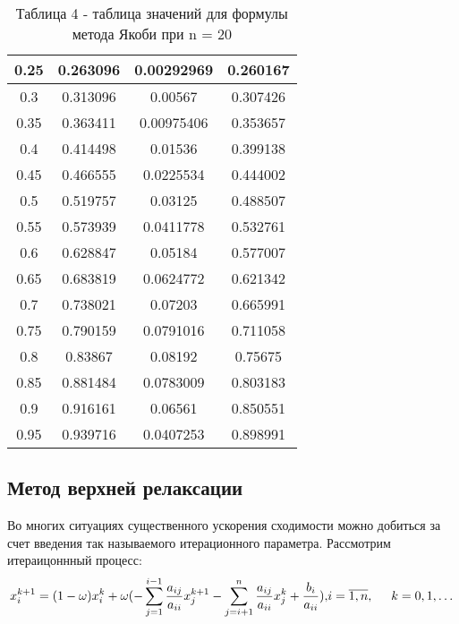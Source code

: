 \documentclass[a4paper,12pt]{article}
\begin{document}
\begin{enumerate}[label = \arabic*.]
{\begin{table}[h]
\begin{tabular}{|c|c|c|c|}
        0.25 &     0.263096 &   0.00292969 &     0.260167\\ \hline
        0.3 &     0.313096 &      0.00567 &     0.307426\\ \hline
        0.35 &     0.363411 &   0.00975406 &     0.353657\\ \hline
        0.4 &     0.414498 &      0.01536 &     0.399138\\ \hline
        0.45 &     0.466555 &    0.0225534 &     0.444002\\ \hline
        0.5 &     0.519757 &      0.03125 &     0.488507\\ \hline
        0.55 &     0.573939 &    0.0411778 &     0.532761\\ \hline
        0.6 &     0.628847 &      0.05184 &     0.577007\\ \hline
        0.65 &     0.683819 &    0.0624772 &     0.621342\\ \hline
        0.7 &     0.738021 &      0.07203 &     0.665991\\ \hline
        0.75 &     0.790159 &    0.0791016 &     0.711058\\ \hline
        0.8 &      0.83867 &      0.08192 &      0.75675\\ \hline
        0.85 &     0.881484 &    0.0783009 &     0.803183\\ \hline
        0.9 &     0.916161 &      0.06561 &     0.850551\\ \hline
        0.95 &     0.939716 &    0.0407253 &     0.898991\\ \hline
      \end{tabular}
      \caption*{\small{Таблица 4 - таблица значений для формулы метода Якоби при n = 20}}
    \end{table}
  }
\end{enumerate}
\newpage



\subsection{Метод верхней релаксации}

\hspace{0.5cm} Во многих ситуациях существенного ускорения сходимости можно добиться
за счет введения так называемого итерационного параметра. Рассмотрим итераицоннный процесс:
\begin{equation}
  x^{k+1}_i = (1 - \omega)x^k_i + \omega(-\sum\limits_{j=1}^{i-1}\frac{a_{ij}}{a_{ii}} x^{k + 1}_j - \sum\limits_{j = i+1}^{n}\frac{a_{ij}}{a_{ii}} x^k_j + \frac{b_i}{a_{ii}}), $$$$
  i = \overline{1, n}, \hspace{0.5cm} k = 0, 1, \dots
\end{equation}
\end{document}
